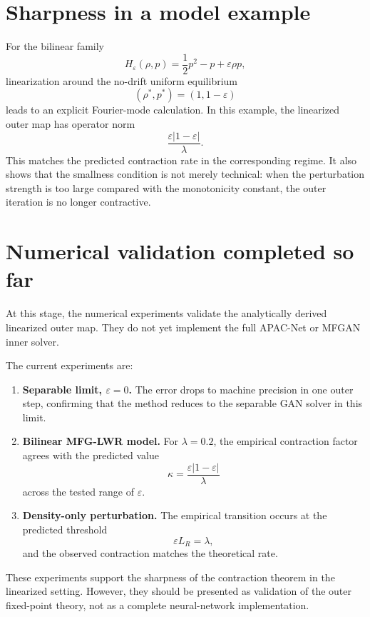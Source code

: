 \documentclass[11pt]{article}
\newcommand{\eps}{\varepsilon}
\begin{document}
\section{Sharpness in a model example}

For the bilinear family
\[
  H_\eps(\rho,p)=\frac12p^2-p+\eps\rho p,
\]
linearization around the no-drift uniform equilibrium
\[
  (\rho^*,p^*)=(1,1-\eps)
\]
leads to an explicit Fourier-mode calculation. In this example, the linearized outer map has operator norm
\[
  \frac{\eps|1-\eps|}{\lambda}.
\]
This matches the predicted contraction rate in the corresponding regime. It also shows that the smallness condition is not merely technical: when the perturbation strength is too large compared with the monotonicity constant, the outer iteration is no longer contractive.

\section{Numerical validation completed so far}

At this stage, the numerical experiments validate the analytically derived linearized outer map. They do not yet implement the full APAC-Net or MFGAN inner solver.

The current experiments are:

\begin{enumerate}[leftmargin=*]
  \item \textbf{Separable limit, $\eps=0$.} The error drops to machine precision in one outer step, confirming that the method reduces to the separable GAN solver in this limit.

  \item \textbf{Bilinear MFG-LWR model.} For $\lambda=0.2$, the empirical contraction factor agrees with the predicted value
  \[
    \kappa=\frac{\eps|1-\eps|}{\lambda}
  \]
  across the tested range of $\eps$.

  \item \textbf{Density-only perturbation.} The empirical transition occurs at the predicted threshold
  \[
    \eps L_R=\lambda,
  \]
  and the observed contraction matches the theoretical rate.
\end{enumerate}

These experiments support the sharpness of the contraction theorem in the linearized setting. However, they should be presented as validation of the outer fixed-point theory, not as a complete neural-network implementation.
\end{document}
